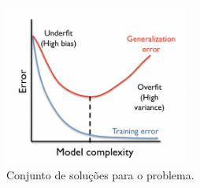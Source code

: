 \begin{figure}[H]
    \center
    \includegraphics[width=6cm]{images/regularizacao.png}
    \caption{\label{figura1}Conjunto de soluções para o problema.}
  \end{figure}

